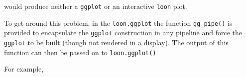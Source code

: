 \documentclass[]{article}
\newenvironment{Shaded}{\begin{snugshade}}{\end{snugshade}}
\newcommand{\KeywordTok}[1]{\textcolor[rgb]{0.13,0.29,0.53}{\textbf{#1}}}
\newcommand{\DataTypeTok}[1]{\textcolor[rgb]{0.13,0.29,0.53}{#1}}
\newcommand{\DecValTok}[1]{\textcolor[rgb]{0.00,0.00,0.81}{#1}}
\newcommand{\FloatTok}[1]{\textcolor[rgb]{0.00,0.00,0.81}{#1}}
\newcommand{\StringTok}[1]{\textcolor[rgb]{0.31,0.60,0.02}{#1}}
\newcommand{\OperatorTok}[1]{\textcolor[rgb]{0.81,0.36,0.00}{\textbf{#1}}}
\newcommand{\NormalTok}[1]{#1}
\begin{document}
\begin{Shaded}
\end{Shaded}

would produce neither a \texttt{ggplot} or an interactive \texttt{loon}
plot.

To get around this problem, in the \texttt{loon.ggplot} the function
\texttt{gg\_pipe()} is provided to encapsulate the \texttt{ggplot}
construction in any pipeline and force the \texttt{ggplot} to be built
(though not rendered in a display). The output of this function can then
be passed on to \texttt{loon.ggplot()}.

For example,
\end{document}
